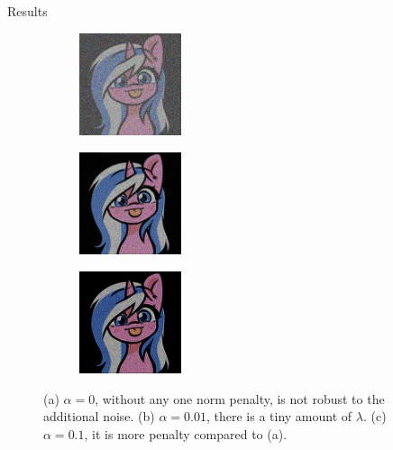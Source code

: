 \documentclass[11pt]{beamer}
\begin{document}
        \begin{frame}{Results}
            \begin{figure}[H]
                \centering
                \begin{subfigure}{3.5cm}
                    \includegraphics[width=3cm]{inverse_linear_experiment1-soln_img.jpg}
                    \caption{} \label{fig:1a}
                \end{subfigure}     %
                \begin{subfigure}{3.5cm}
                    \includegraphics[width=3cm]{inverse_linear_experiment2-soln_img.jpg}
                    \caption{} \label{fig:1b}
                \end{subfigure}     %
                \begin{subfigure}{3.5cm}
                    \includegraphics[width=3cm]{inverse_linear_experiment3-soln_img.jpg}
                    \caption{} \label{fig:1c}
                \end{subfigure}
                \caption{(a) $\alpha = 0$, without any one norm penalty, is not robust to the additional noise. (b) $\alpha = 0.01$, there is a tiny amount of $\lambda$. (c) $\alpha = 0.1$, it is more penalty compared to (a).}
                \label{fig:alto_deblurred}
            \end{figure}
        \end{frame}
\end{document}
